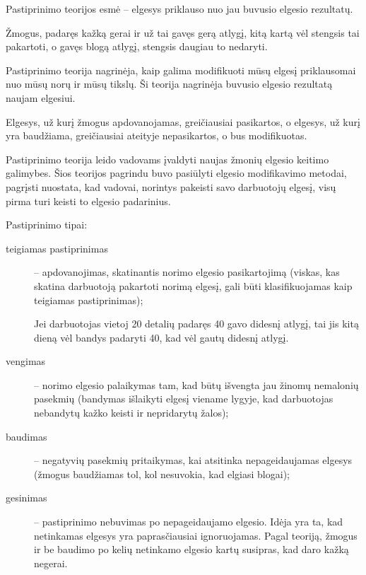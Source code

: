 Pastiprinimo teorijos esmė – elgesys priklauso nuo jau buvusio elgesio
rezultatų.

\begin{exmp}
  Žmogus, padaręs kažką gerai ir už tai gavęs gerą atlygį, kitą kartą
  vėl stengsis tai pakartoti, o gavęs blogą atlygį, stengsis daugiau
  to nedaryti.
\end{exmp}

Pastiprinimo teorija nagrinėja, kaip galima modifikuoti mūsų elgesį
priklausomai nuo mūsų norų ir mūsų tikslų. Ši teorija nagrinėja
buvusio elgesio rezultatą naujam elgesiui.

Elgesys, už kurį žmogus apdovanojamas, greičiausiai pasikartos, o
elgesys, už kurį yra baudžiama, greičiausiai ateityje nepasikartos,
o bus modifikuotas.

Pastiprinimo teorija leido vadovams įvaldyti naujas žmonių elgesio
keitimo galimybes. Šios teorijos pagrindu buvo pasiūlyti elgesio
modifikavimo metodai, pagrįsti nuostata, kad vadovai, norintys
pakeisti savo darbuotojų elgesį, visų pirma turi keisti to elgesio
padarinius.

Pastiprinimo tipai:
\begin{description}
  \item[teigiamas pastiprinimas] – apdovanojimas, skatinantis norimo
    elgesio pasikartojimą (viskas, kas skatina darbuotoją pakartoti norimą
    elgesį, gali būti klasifikuojamas kaip teigiamas pastiprinimas);
    \begin{exmp}
      Jei darbuotojas vietoj 20 detalių padaręs 40 gavo didesnį atlygį,
      tai jis kitą dieną vėl bandys padaryti 40, kad vėl gautų didesnį
      atlygį.
    \end{exmp}
  \item[vengimas] – norimo elgesio palaikymas tam, kad būtų išvengta
    jau žinomų nemalonių pasekmių (bandymas išlaikyti elgesį viename
    lygyje, kad darbuotojas nebandytų kažko keisti ir nepridarytų žalos);
  \item[baudimas] – negatyvių pasekmių pritaikymas, kai atsitinka
    nepageidaujamas elgesys (žmogus baudžiamas tol, kol nesuvokia, kad
    elgiasi blogai);
  \item[gesinimas] – pastiprinimo nebuvimas po nepageidaujamo elgesio.
    Idėja yra ta, kad netinkamas elgesys yra paprasčiausiai ignoruojamas.
    Pagal teoriją, žmogus ir be baudimo po kelių netinkamo elgesio kartų
    susipras, kad daro kažką negerai.
\end{description}

